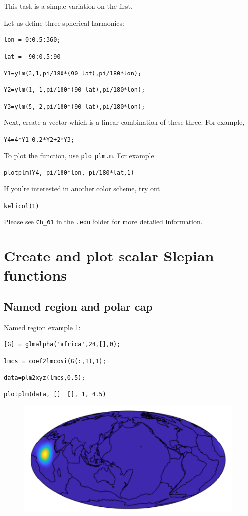 \documentclass{article}
\begin{document}
\setlength{\parskip}{0.5cm plus4mm minus3mm}

This task is a simple variation on the first. 

Let us define three spherical harmonics:

\verb+lon = 0:0.5:360;+

\verb+lat = -90:0.5:90;+

\verb+Y1=ylm(3,1,pi/180*(90-lat),pi/180*lon);+

\verb+Y2=ylm(1,-1,pi/180*(90-lat),pi/180*lon);+

\verb+Y3=ylm(5,-2,pi/180*(90-lat),pi/180*lon);+

Next, create a vector which is a linear combination of these three. For example,

\verb!Y4=4*Y1-0.2*Y2+2*Y3;!

To plot the function, use \verb+plotplm.m+. For example,

\verb+plotplm(Y4, pi/180*lon, pi/180*lat,1)+

If you're interested in another color scheme, try out 

\verb+kelicol(1)+

Please see \verb+Ch_01+ in the \verb+.edu+ folder for more detailed information.

\section{Create and plot scalar Slepian functions}

\subsection{Named region and polar cap}

Named region example 1:

\setlength{\parskip}{.1mm}

\verb![G] = glmalpha('africa',20,[],0);!

\verb!lmcs = coef2lmcosi(G(:,1),1);!

\verb!data=plm2xyz(lmcs,0.5);!

\verb!plotplm(data, [], [], 1, 0.5)!

\begin{figure}[H]
\includegraphics[scale=.75]{africa_ex_1}
\end{figure}
\end{document}
